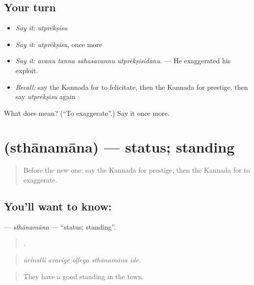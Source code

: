 \subsection*{Your turn}
\begin{itemize}
\raggedright
  \item \emph{Say it:} \emph{utprēkṣisu}
  \item \emph{Say it:} \emph{utprēkṣisu}, once more
  \item \emph{Say it:} \emph{avanu tanna sāhasavannu utprēkṣisidanu.} — He exaggerated his exploit.
  \item \emph{Recall:} say the Kannada for to felicitate, then the Kannada for prestige, then say \emph{utprēkṣisu} again
\end{itemize}

\begin{tcolorbox}[breakable,colback=teal!4,colframe=teal!35!black,title={Before you move on}]
What does  mean? (\textquotedblleft{}To exaggerate\textquotedblright{}.) Say it once more.
\end{tcolorbox}
\section[\texorpdfstring{\kn{ಸ್ಥಾನಮಾನ} (sthānamāna)}{ಸ್ಥಾನಮಾನ (sthānamāna)}]{ (sthānamāna) — status; standing}

\label{lesson:KA-C389-sthanamana}



\begin{quote}
Before the new one: say the Kannada for prestige, then the Kannada for to exaggerate.
\end{quote}

\subsection*{You'll want to know: }
\textbf{} — \emph{sthānamāna} — \textquotedblleft{}status; standing\textquotedblright{}.

\begin{quote}
    .
\end{quote}

\begin{quote}
\emph{ūrinalli avarige oḷḷeya sthānamāna ide.}
\end{quote}

\begin{quote}
They have a good standing in the town.
\end{quote}


